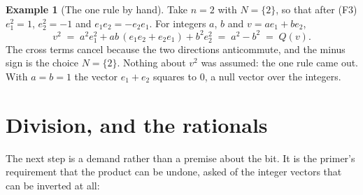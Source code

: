 \documentclass[11pt]{article}
\theoremstyle{definition}
\newtheorem{example}[theorem]{Example}
\theoremstyle{plain}
\begin{document}
\begin{example}[The one rule by hand]\label{c:note.geometry-first.one-rule-hand}
Take $n = 2$ with $N = \{2\}$, so that after (F3) $e_{1}^{2} = 1$, $e_{2}^{2} = -1$ and $e_{1}e_{2} = -e_{2}e_{1}$. For integers $a$, $b$ and $v = a e_{1} + b e_{2}$,
\[
v^{2} \;=\; a^{2}e_{1}^{2} + ab\,(e_{1}e_{2} + e_{2}e_{1}) + b^{2}e_{2}^{2} \;=\; a^{2} - b^{2} \;=\; Q(v) .
\]
The cross terms cancel because the two directions anticommute, and the minus sign is the choice $N = \{2\}$. Nothing about $v^{2}$ was assumed: the one rule came out. With $a = b = 1$ the vector $e_{1} + e_{2}$ squares to $0$, a null vector over the integers.
\end{example}

\section{Division, and the rationals}

\label{c:note.geometry-first.setting-division-rationals}
The next step is a demand rather than a premise about the bit. It is the primer's requirement \cite[Section 2]{ButlerT0} that the product can be undone, asked of the integer vectors that can be inverted at all:
\end{document}
